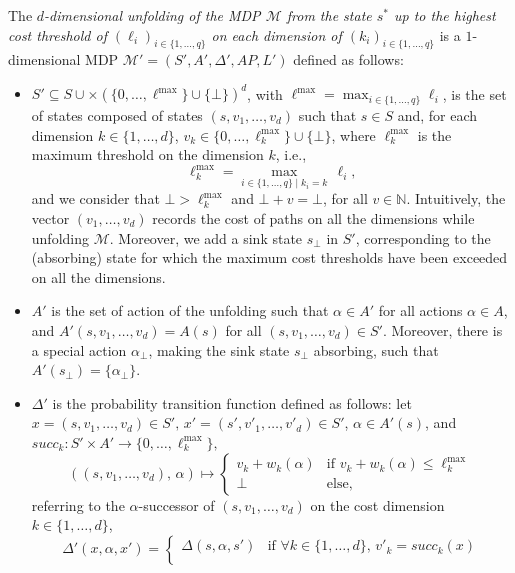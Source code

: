 \begin{definition}
The \textit{$d$-dimensional unfolding of the MDP $\mathcal{M}$ from the state $s^*$
up to the highest cost threshold of $(\ell_i)_{i \in \{1, \dots, q\}}$ on each dimension of $(k_i)_{i \in \{1, \dots, q\}}$} is a $1$-dimensional MDP \sloppy $\mathcal{M}' = {(S', A', \Delta', AP, L')}$ defined as follows:
  \begin{itemize}
    \item $S' \subseteq S \cup \times (\{ 0, \dots, \ell^{\max} \} \cup \{\bot\})^d$, with $\ell^{\max} = \max_{i \in \{1, \dots, q\}}\ell_i$,  is the set of states composed of states $(s, v_1, \dots, v_d)$ such that $s \in S$ and, for each dimension $k \in \{1, \dots, d\}$, $v_k \in \{0, \dots, \ell^{\max}_k\} \cup \{\bot\}$, where $\ell^{\max}_k$ is the maximum threshold on the dimension $k$, i.e., \[\ell^{\max}_k = \max_{i \in \{1, \dots, q\} \; | \; k_i = k }  \, \ell_i,\]
    and we consider that $\bot > \ell_k^{\max}$
    and $\bot + v = \bot$, for all $v \in \mathbb{N}$.
    Intuitively, the vector $(v_1, \dots, v_d)$ records the cost of paths on all the dimensions while unfolding $\mathcal{M}$.
    Moreover, we add a sink state $s_\bot$ in $S'$, corresponding to the (absorbing) state for which the maximum cost thresholds have been exceeded on all the dimensions.
    \item $A'$ is the set of action of the unfolding such that $\alpha \in A'$
    for all actions $\alpha \in A$, and
    $A'(s, v_1, \dots, v_d) = A(s)$
    for all $(s, v_1, \dots, v_d) \in S'$.
    Moreover, there is a special action $\alpha_\bot$, making the sink state $s_\bot$ absorbing, such that $A'(s_\bot) = \{\alpha_\bot\}$.
    \item $\Delta'$ is the probability transition function defined as follows: let $x = (s, v_1, \dots, v_d)\in S' , \, x'=(s', v'_1, \dots, v'_d) \in S'$, $\alpha \in A'(s)$,
    and
    $succ_k: S' \times A' \rightarrow \{0, \dots, \ell^{\max}_k\},$
    \[((s, v_1, \dots, v_d), \, \alpha) \mapsto \begin{cases}
      v_k + w_k(\alpha) & \text{if } v_k + w_k(\alpha) \leq \ell^{\max}_k \\
      \bot & \text{else},
    \end{cases}\]
    referring to the $\alpha$-successor of $(s, v_1, \dots, v_d)$ on the cost dimension $k \in \{1, \dots, d\}$,
    \[
    \Delta'(x, \alpha, x') = \begin{cases}
      \Delta(s, \alpha, s') & \text{if } \forall k \in \{1, \dots, d\}, \, v'_k = succ_k(x) \\

\end{cases}\]
\end{itemize}
\end{definition}
